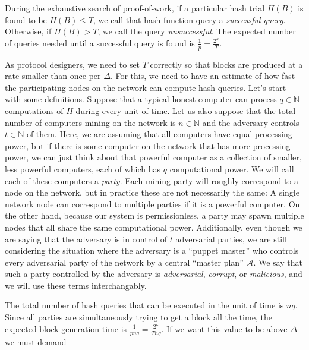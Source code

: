 During the exhaustive search of proof-of-work, if a particular hash trial $H(B)$ is found to be $H(B) \leq T$, we call that hash function query a \emph{successful query}. Otherwise, if $H(B) > T$, we call the query \emph{unsuccessful}. The expected number of queries needed until a successful query is found is $\frac{1}{p} = \frac{2^\kappa}{T}$.

As protocol designers, we need to set $T$ correctly so that blocks are produced at a rate smaller than once per $\Delta$. For this, we need to have an estimate of how fast the participating nodes on the network can compute hash queries. Let's start with some definitions. Suppose that a typical honest computer can process
$q \in \mathbb{N}$
computations of $H$ during every unit of time. Let us also suppose that the total number of computers mining on the network is
$n \in \mathbb{N}$
and the adversary controls
$t \in \mathbb{N}$
of them. Here, we are assuming that all computers have equal processing power, but if there is some computer on the network that has more processing power, we can just think about that powerful computer as a collection of smaller, less powerful computers, each of which has $q$ computational power. We will call each of these computers a
\emph{party}.
Each mining party will roughly correspond to a node on the network, but in practice these are not necessarily the same: A single network node can correspond to multiple parties if it is a powerful computer. On the other hand, because our system is permissionless, a party may spawn multiple nodes that all share the same computational power. Additionally, even though we are saying that the adversary is in control of $t$ adversarial parties, we are still considering the situation where the adversary is a ``puppet master'' who controls every adversarial party of the network by a central ``master plan'' $\mathcal{A}$. We say that such a party controlled by the adversary is \emph{adversarial}, \emph{corrupt}, or \emph{malicious}, and we will use these terms interchangably.

The total number of hash queries that can be executed in the unit of time is $nq$.
Since all parties are simultaneously trying to get a block all the time, the expected block generation
time is $\frac{1}{pnq} = \frac{2^\kappa}{Tnq}$. If we want this value to be above $\Delta$ we must demand

